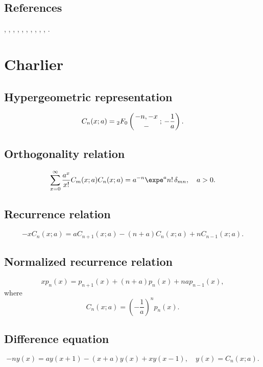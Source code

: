 \documentclass[envcountchap,graybox]{svmono}
\newcommand{\hyp}[5]{\mbox{}_{#1}{F}_{#2}
\left(\genfrac{}{}{0pt}{}{#3}{#4}\,;\,#5\right)}
\begin{document}
\subsection*{References}
\cite{Andrade}, \cite{BergVignat}, \cite{Carlitz57I}, \cite{Dattoli2003},
\cite{DohaAhmed2004}, \cite{DohaAhmed2006}, \cite{Grosswald}, \cite{Ismail2005II},
\cite{KrallFrink}, \cite{Lesky98}, \cite{NikiforovUvarov}.


\section{Charlier}

\par\setcounter{equation}{0}

\subsection*{Hypergeometric representation}
\begin{equation}
\label{DefCharlier}
C_n(x;a)=\hyp{2}{0}{-n,-x}{-}{-\frac{1}{a}}.
\end{equation}

\subsection*{Orthogonality relation}
\begin{equation}
\label{OrtCharlier}
\sum_{x=0}^{\infty}\frac{a^x}{x!}C_m(x;a)C_n(x;a)=
a^{-n}\expe^an!\,\delta_{mn},\quad a > 0.
\end{equation}

\subsection*{Recurrence relation}
\begin{equation}
\label{RecCharlier}
-xC_n(x;a)=aC_{n+1}(x;a)-(n+a)C_n(x;a)+nC_{n-1}(x;a).
\end{equation}

\subsection*{Normalized recurrence relation}
\begin{equation}
\label{NormRecCharlier}
xp_n(x)=p_{n+1}(x)+(n+a)p_n(x)+nap_{n-1}(x),
\end{equation}
where
$$C_n(x;a)=\left(-\frac{1}{a}\right)^np_n(x).$$

\subsection*{Difference equation}
\begin{equation}
\label{dvCharlier}
-ny(x)=ay(x+1)-(x+a)y(x)+xy(x-1),\quad y(x)=C_n(x;a).
\end{equation}
\end{document}
